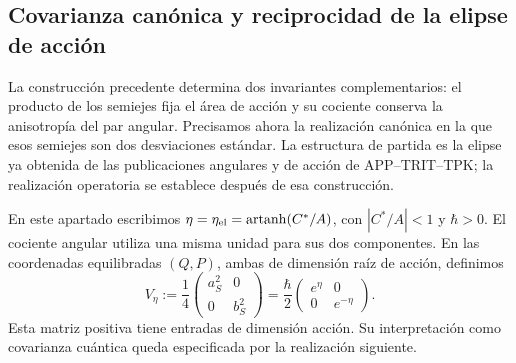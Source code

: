 
\subsection{Covarianza canónica y reciprocidad de la elipse de acción}
\label{ii:sec:ii-area-covarianza}

La construcción precedente determina dos invariantes complementarios:
el producto de los semiejes fija el área de acción y su cociente conserva
la anisotropía del par angular. Precisamos ahora la realización canónica
en la que esos semiejes son dos desviaciones estándar. La estructura de
partida es la elipse ya obtenida de las publicaciones angulares y de
acción de APP--TRIT--TPK; la realización operatoria se establece después
de esa construcción.

En este apartado escribimos \(\eta=\eta_{\rm el}
=\operatorname{artanh}(C^*/A)\), con \(|C^*/A|<1\) y
\(\hbar>0\). El cociente angular utiliza una misma unidad para sus dos
componentes. En las coordenadas equilibradas \((Q,P)\), ambas de
dimensión raíz de acción, definimos
\begin{equation}
 V_\eta:=\frac14
 \begin{pmatrix}a_S^2&0\\0&b_S^2\end{pmatrix}
 =\frac{\hbar}{2}
 \begin{pmatrix}e^\eta&0\\0&e^{-\eta}\end{pmatrix}.
 \label{ii:eq:ii-covarianza-geometrica}
\end{equation}
Esta matriz positiva tiene entradas de dimensión acción. Su interpretación
como covarianza cuántica queda especificada por la realización siguiente.

